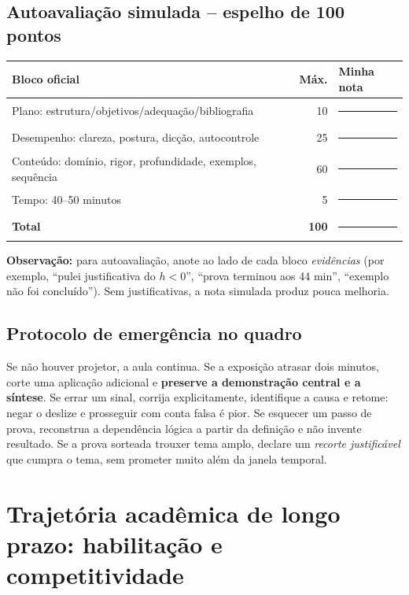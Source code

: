 \documentclass[11pt,a4paper]{article}
\begin{document}
\subsection{Autoavaliação simulada -- espelho de 100 pontos}
\begin{tabularx}{\textwidth}{Xr p{}}
\toprule
\textbf{Bloco oficial} & \textbf{Máx.} & \textbf{Minha nota}\\\midrule
Plano: estrutura/objetivos/adequação/bibliografia & 10 & \rule{1cm}{.4pt}\\
Desempenho: clareza, postura, dicção, autocontrole & 25 & \rule{1cm}{.4pt}\\
Conteúdo: domínio, rigor, profundidade, exemplos, sequência & 60 & \rule{1cm}{.4pt}\\
Tempo: 40--50 minutos & 5 & \rule{1cm}{.4pt}\\\midrule
\textbf{Total} & \textbf{100} & \rule{1cm}{.4pt}\\\bottomrule
\end{tabularx}
\textbf{Observação:} para autoavaliação, anote ao lado de cada bloco \textit{evidências} (por exemplo, ``pulei justificativa do $h<0$'', ``prova terminou aos 44 min'', ``exemplo não foi concluído''). Sem justificativas, a nota simulada produz pouca melhoria.

\subsection{Protocolo de emergência no quadro}
Se não houver projetor, a aula continua. Se a exposição atrasar dois minutos, corte uma aplicação adicional e \textbf{preserve a demonstração central e a síntese}. Se errar um sinal, corrija explicitamente, identifique a causa e retome: negar o deslize e prosseguir com conta falsa é pior. Se esquecer um passo de prova, reconstrua a dependência lógica a partir da definição e não invente resultado. Se a prova sorteada trouxer tema amplo, declare um \emph{recorte justificável} que cumpra o tema, sem prometer muito além da janela temporal.

\section{Trajetória acadêmica de longo prazo: habilitação e competitividade}
\end{document}
